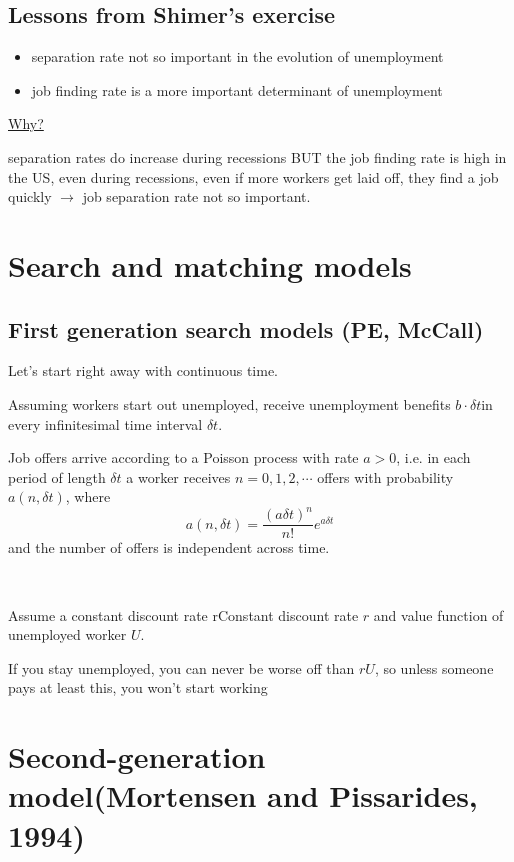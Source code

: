 \subsection{Lessons from Shimer’s exercise}
\begin{itemize}
    \item separation rate not so important in the evolution of
    unemployment
    \item job finding rate is a more important determinant of
    unemployment
\end{itemize}

\underline{Why?}

separation rates do increase during recessions
BUT the job ﬁnding rate is high in the US, even during
recessions, even if more workers get laid oﬀ, they ﬁnd a job quickly $\rightarrow$
job separation rate not so important.

\section{Search and matching models}

\subsection{First generation search models (PE, McCall)}
Let's start right away with continuous time.

Assuming workers start out unemployed, receive unemployment benefits $b\cdot \delta t$in every infinitesimal time interval $\delta t$.

Job offers arrive according to a Poisson process with rate $a>0$, i.e.
in each period of length $\delta t$ a worker receives $n = 0, 1, 2, \cdots$ offers with probability $a(n, \delta t)$,
where
\[a(n, \delta t) = \frac{(a \delta t)^n}{n!} e^{a \delta t} \]
and the number of offers is independent across time.

\begin{remark}
    \

    Assume a constant discount rate rConstant discount rate $r$ 
    and value function of unemployed worker $U$.
    
    If you stay unemployed, you can never be worse off than $rU$, 
    so unless someone pays at least this, you won’t start working
\end{remark}

\section{Second-generation model(Mortensen and Pissarides, 1994)}

